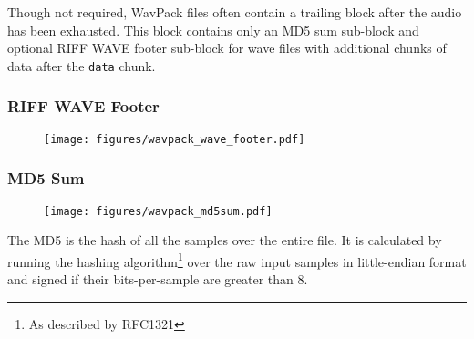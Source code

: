 Though not required, WavPack files often contain a trailing
block after the audio has been exhausted.
This block contains only an MD5 sum sub-block and optional
RIFF WAVE footer sub-block for wave files with additional chunks of
data after the \texttt{data} chunk.

\subsubsection{RIFF WAVE Footer}
\begin{figure}[h]
\texttt{[image: figures/wavpack\_wave\_footer.pdf]}
\end{figure}

\subsubsection{MD5 Sum}
\begin{figure}[h]
\texttt{[image: figures/wavpack\_md5sum.pdf]}
\end{figure}
\par
\noindent
The MD5 is the hash of all the samples over the entire file.
It is calculated by running the
hashing algorithm\footnote{As described by RFC1321} over
the raw input samples in little-endian format
and signed if their bits-per-sample are greater than 8.

